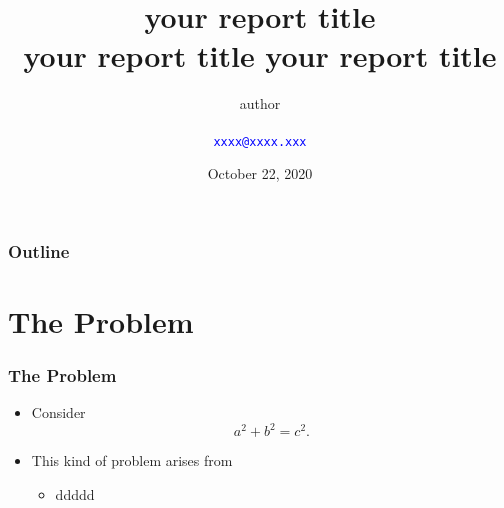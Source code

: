 \documentclass[10pt,compress,t]{beamer}
\begin{document}
\title[\textcolor{blue}{abbreviation of the title}]%
  {your report title \\ your report title your report title}

\author[author]%
  {author \rule[0pt]{0pt}{20pt}\\
  \textcolor{blue}{\texttt{xxxx@xxxx.xxx}}}


\date[22/10/2020]{\small October 22, 2020}

\begin{frame}[plain]
  \titlepage
\end{frame}

\begin{frame}
  \frametitle{Outline}
   \tableofcontents[hideallsubsections] %
\end{frame}

\section[Problem]{The Problem}
\AtBeginSection[] %
{ \begin{frame}<beamer> %
  \tableofcontents[currentsection,hideallsubsections]%
  \end{frame}
}

\begin{frame}
  \frametitle{The Problem}
\begin{itemize}
\item Consider
     $$ a^2+b^2=c^2.$$
\smallskip

\item<2-> This kind of problem arises from
    \begin{itemize}
        \item  ddddd
    \end{itemize}
\end{itemize}
\end{frame}
\end{document}
